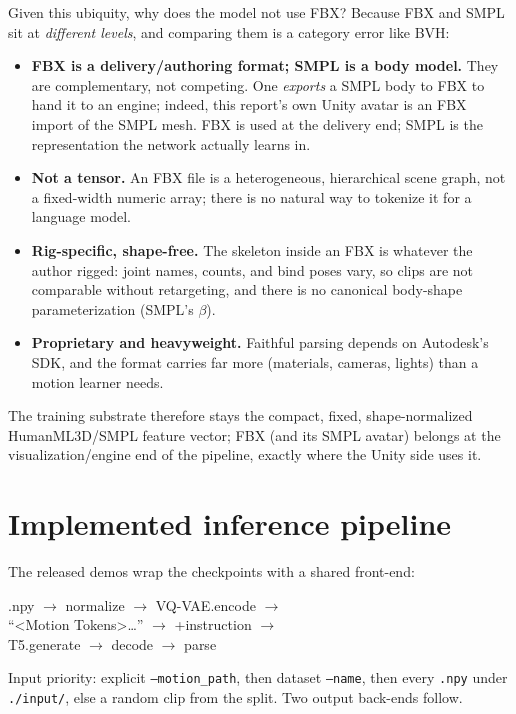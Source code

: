 \documentclass[10pt,twocolumn]{article}
\newcommand{\code}[1]{\texttt{\small #1}}
\begin{document}
Given this ubiquity, why does the model not use FBX? Because FBX and SMPL sit at \emph{different
levels}, and comparing them is a category error like BVH:
\begin{itemize}
  \item \textbf{FBX is a delivery/authoring format; SMPL is a body model.} They are complementary,
        not competing. One \emph{exports} a SMPL body to FBX to hand it to an engine; indeed,
        this report's own Unity avatar is an FBX import of the SMPL mesh. FBX is used at the delivery
        end; SMPL is the representation the network actually learns in.
  \item \textbf{Not a tensor.} An FBX file is a heterogeneous, hierarchical scene graph, not a
        fixed-width numeric array; there is no natural way to tokenize it for a language model.
  \item \textbf{Rig-specific, shape-free.} The skeleton inside an FBX is whatever the author rigged:
        joint names, counts, and bind poses vary, so clips are not comparable without
        retargeting, and there is no canonical body-shape parameterization (SMPL's $\beta$).
  \item \textbf{Proprietary and heavyweight.} Faithful parsing depends on Autodesk's SDK, and the
        format carries far more (materials, cameras, lights) than a motion learner needs.
\end{itemize}
The training substrate therefore stays the compact, fixed, shape-normalized HumanML3D/SMPL feature
vector; FBX (and its SMPL avatar) belongs at the visualization/engine end of the pipeline, exactly
where the Unity side uses it.

\section{Implemented inference pipeline}
The released demos wrap the checkpoints with a shared front-end:
\begin{center}\footnotesize\ttfamily
.npy $\rightarrow$ normalize $\rightarrow$ VQ-VAE.encode $\rightarrow$\\
``<Motion Tokens>\ldots'' $\rightarrow$ +instruction $\rightarrow$\\
T5.generate $\rightarrow$ decode $\rightarrow$ parse
\end{center}
Input priority: explicit \code{--motion\_path}, then dataset \code{--name}, then every \code{.npy}
under \code{./input/}, else a random clip from the split. Two output back-ends follow.
\end{document}
